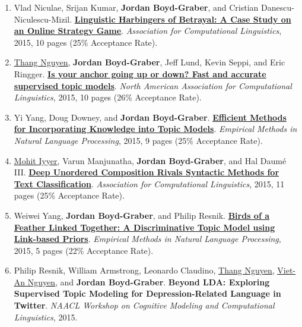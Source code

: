 \documentclass[10pt,a4paper]{article} %
\begin{document}
{\begin{enumerate}
	 \item Vlad Niculae, Srijan Kumar, {\bf Jordan Boyd-Graber}, and Cristian Danescu-Niculescu-Mizil.  {\bf \href{http://cs.colorado.edu/~jbg//docs/2015_acl_diplomacy.pdf}{Linguistic Harbingers of Betrayal: A Case Study on an Online Strategy Game}}.  \emph{Association for Computational Linguistics}, 2015, 10 pages (25\% Acceptance Rate).

	 \item \underline{\href{http://www.umiacs.umd.edu/~daithang/}{Thang Nguyen}}, {\bf Jordan Boyd-Graber}, Jeff Lund, Kevin Seppi, and Eric Ringger.  {\bf \href{http://cs.colorado.edu/~jbg//docs/2015_naacl_supervised_anchor.pdf}{Is your anchor going up or down?  {F}ast and accurate supervised topic models}}.  \emph{North American Association for Computational Linguistics}, 2015, 10 pages (26\% Acceptance Rate).

	 \item Yi Yang, Doug Downey, and {\bf Jordan Boyd-Graber}.  {\bf \href{http://cs.colorado.edu/~jbg//docs/2015_emnlp_fast_priors.pdf}{Efficient Methods for Incorporating Knowledge into Topic Models}}.  \emph{Empirical Methods in Natural Language Processing}, 2015, 9 pages (25\% Acceptance Rate).

	 \item \underline{\href{http://cs.umd.edu/~miyyer/}{Mohit Iyyer}}, Varun Manjunatha, {\bf Jordan Boyd-Graber}, and Hal {Daum\'{e} III}.  {\bf \href{http://cs.colorado.edu/~jbg//docs/2015_acl_dan.pdf}{Deep Unordered Composition Rivals Syntactic Methods for Text Classification}}.  \emph{Association for Computational Linguistics}, 2015, 11 pages (25\% Acceptance Rate).

	 \item Weiwei Yang, {\bf Jordan Boyd-Graber}, and Philip Resnik.  {\bf \href{http://cs.colorado.edu/~jbg//docs/2015_emnlp_hinge_link.pdf}{Birds of a Feather Linked Together: A Discriminative Topic Model using Link-based Priors}}.  \emph{Empirical Methods in Natural Language Processing}, 2015, 5 pages (22\% Acceptance Rate).

	 \item Philip Resnik, William Armstrong, Leonardo Claudino, \underline{\href{http://www.umiacs.umd.edu/~daithang/}{Thang Nguyen}}, \underline{\href{http://www.cs.umd.edu/~vietan/index.htm}{Viet-An Nguyen}}, and {\bf Jordan Boyd-Graber}.  {\bf Beyond {LDA}: Exploring Supervised Topic Modeling for Depression-Related Language in Twitter}.  \emph{NAACL Workshop on Cognitive Modeling and Computational Linguistics}, 2015.


\end{enumerate}
}
\end{document}
